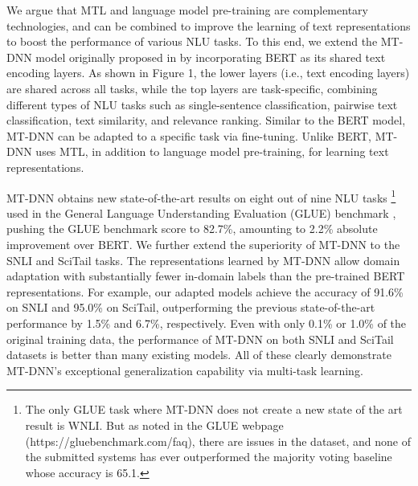 We argue that MTL and language model pre-training are complementary technologies, and can be combined to improve the learning of text representations to boost the performance of various NLU tasks.
To this end, we extend the MT-DNN model originally proposed in \citet{liu2015mtl} by incorporating BERT as its shared text encoding layers. 
As shown in Figure 1, the lower layers (i.e., text encoding layers) are shared across all tasks, while the top layers are task-specific, combining different types of NLU tasks such as single-sentence classification, pairwise text classification, text similarity, and relevance ranking. 
Similar to the BERT model, MT-DNN can be adapted to a specific task via fine-tuning. Unlike BERT, MT-DNN uses MTL, in addition to language model pre-training, for learning text representations.

MT-DNN obtains new state-of-the-art results on eight out of nine NLU tasks
\footnote{The only GLUE task where MT-DNN does not create a new state of the art result is WNLI. But as noted in the GLUE webpage (https://gluebenchmark.com/faq), there are issues in the dataset, and none of the submitted systems has ever outperformed the majority voting baseline whose accuracy is 65.1.}
used in the General Language Understanding Evaluation (GLUE) benchmark \citep{wang2018glue}, pushing the GLUE benchmark score to 82.7\%, amounting to 2.2\% absolute improvement over BERT. We further extend the superiority of MT-DNN to the SNLI \cite{bowman2015large} and SciTail \cite{scitail} tasks. The representations learned by MT-DNN allow domain adaptation with substantially fewer in-domain labels than the pre-trained BERT representations. For example, our adapted models achieve the accuracy of 91.6\% on SNLI and 95.0\% on SciTail, outperforming the previous state-of-the-art performance by 1.5\% and 6.7\%, respectively. Even with only 0.1\% or 1.0\% of the original training data, the performance of MT-DNN on both SNLI and SciTail datasets is better than many existing models. All of these clearly demonstrate MT-DNN's exceptional generalization capability via multi-task learning.

